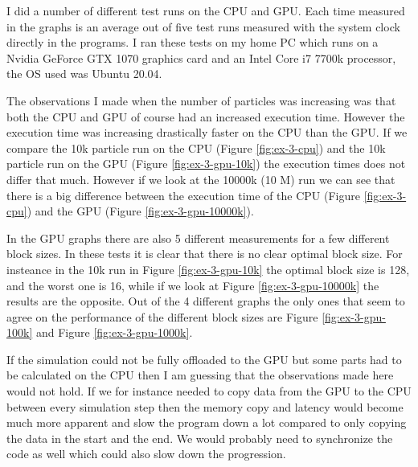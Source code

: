 \documentclass[a4paper, 12pt]{article}
\def\f#1{Figure \ref{fig:#1}}
\begin{document}
I did a number of different test runs on the CPU and GPU. Each time measured in the graphs is an average out of five test runs measured with the system clock directly in the programs. I ran these tests on my home PC which runs on a Nvidia GeForce GTX 1070 graphics card and an Intel Core i7 7700k processor, the OS used was Ubuntu 20.04.
\par The observations I made when the number of particles was increasing was that both the CPU and GPU of course had an increased execution time. However the execution time was increasing drastically faster on the CPU than the GPU. If we compare the 10k particle run on the CPU (\f{ex-3-cpu}) and the 10k particle run on the GPU (\f{ex-3-gpu-10k}) the execution times does not differ that much. However if we look at the 10000k (10 M) run we can see that there is a big difference between the execution time of the CPU (\f{ex-3-cpu}) and the GPU (\f{ex-3-gpu-10000k}).
\par In the GPU graphs there are also 5 different measurements for a few different block sizes. In these tests it is clear that there is no clear optimal block size. For insteance in the 10k run in \f{ex-3-gpu-10k} the optimal block size is 128, and the worst one is 16, while if we look at \f{ex-3-gpu-10000k} the results are the opposite. Out of the 4 different graphs the only ones that seem to agree on the performance of the different block sizes are \f{ex-3-gpu-100k} and \f{ex-3-gpu-1000k}.
\par If the simulation could not be fully offloaded to the GPU but some parts had to be calculated on the CPU then I am guessing that the observations made here would not hold. If we for instance needed to copy data from the GPU to the CPU between every simulation step then the memory copy and latency would become much more apparent and slow the program down a lot compared to only copying the data in the start and the end. We would probably need to synchronize the code as well which could also slow down the progression.
\end{document}
